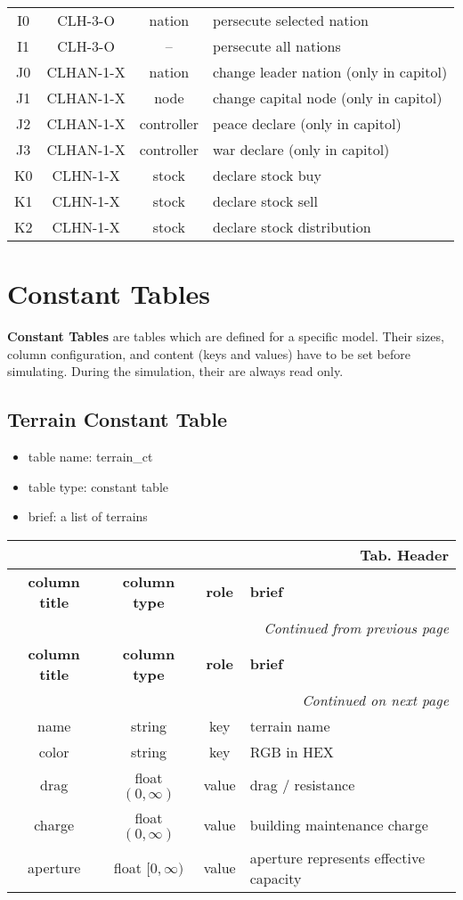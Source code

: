 \documentclass[a4paper,oneside,titlepage]{report}
\newcommand*{\LTHeaderIV}[5]{
  \multicolumn{4}{r}{\textbf{Tab. \thesubsection} \textbf{#1}}\\    
  \hline
  \textbf{#2} & \textbf{#3} & \textbf{#4} & \textbf{#5}\\
  \hline
  
  \endfirsthead
  \multicolumn{4}{r}{\textit{Continued from previous page}}\\    
  \hline
  \textbf{#2} & \textbf{#3} & \textbf{#4} & \textbf{#5}\\
  \hline
  \endhead
  \hline
  \multicolumn{4}{r}{\textit{Continued on next page}}\\
  \endfoot
  \hline
  \endlastfoot  
}
\begin{document}
\begin{longtable}{ |c|c|c|l| }
  \hline
  I0 & CLH-3-O & nation & persecute selected nation\\
  I1 & CLH-3-O & --     & persecute all nations\\
  \hline
  J0 & CLHAN-1-X & nation     & change leader nation (only in capitol)\\
  J1 & CLHAN-1-X & node       & change capital node (only in capitol)\\
  J2 & CLHAN-1-X & controller & peace declare (only in capitol)\\
  J3 & CLHAN-1-X & controller & war declare (only in capitol)\\
  \hline
  K0 & CLHN-1-X & stock & declare stock buy\\
  K1 & CLHN-1-X & stock & declare stock sell\\
  K2 & CLHN-1-X  & stock & declare stock distribution\\
\end{longtable}


\section{Constant Tables}
\textbf{Constant Tables} are tables which are defined for a specific model. Their sizes, column configuration, and content (keys and values) have to be set before simulating. During the simulation, their are always read only.

\subsection{Terrain Constant Table}
\begin{itemize}
  \setlength{\itemsep}{0pt}
  \setlength{\parskip}{0pt}
\item table name: terrain\_ct  
\item table type: constant table   
\item brief: a list of terrains
\end{itemize}

\vspace{-0.5cm}
\begin{longtable}{ |c|c|c|l| } 
  \LTHeaderIV{Header}{column title}{column type}{role}{brief}                    
  name & string & key & terrain name\\
  color & string  & key & RGB in HEX\\
  drag & float $(0, \infty)$ & value & drag $/$ resistance\\
  charge & float $(0, \infty)$ & value & building maintenance charge\\
  aperture & float $[0, \infty)$ & value & aperture represents effective capacity\\
\end{longtable}        
\end{document}
